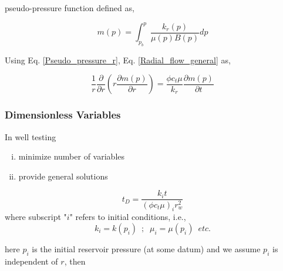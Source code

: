 \documentclass{llncs}
\numberwithin{equation}{section}
\numberwithin{figure}{section}
\numberwithin{table}{section}
\begin{document}
     pseudo-pressure function defined as,

    \begin{equation}
        m\left( p \right)=\int_{{{p}_{b}}}^{p}{\frac{{{k}_{r}}\left( p \right)}{\mu \left( p \right)B\left( p \right)}dp}
        \label{Pseudo_pressure_r}
    \end{equation}

    Using Eq. \ref{Pseudo_pressure_r},  Eq. \ref{Radial_flow_general}  as,

    \begin{equation}
        \frac{1}{r}\frac{\partial }{\partial r}\left( r\frac{\partial m\left( p \right)}{\partial r} \right)=\frac{\phi {{c}_{t}}\mu }{{{k}_{r}}}\frac{\partial m\left( p \right)}{\partial t}
        \label{Radial_flow_Pseudo_pressure}
    \end{equation}

    \subsubsection{Dimensionless Variables}
    In well testing 
    \begin{enumerate}[(i)]
        \item minimize number of variables 
        \item provide general solutions
    \end{enumerate}

    \begin{equation}
        {{t}_{D}}=\frac{{{k}_{i}}t}{{{\left( \phi {{c}_{t}}\mu  \right)}_{i}}r_{w}^{2}}
        \label{Dimensionless_time}
    \end{equation}
    where subscript "$i$" refers to initial conditions, i.e.,
    \begin{equation*}
        k_{i} = k(p_{i})\,\,\,;\,\,\ \mu_{i}=\mu(p_{i})\,\,\,etc.
    \end{equation*}

    here $p_{i}$ is the initial reservoir pressure (at some datum) and we assume $p_{i}$ is independent of $r$, then
\end{document}

